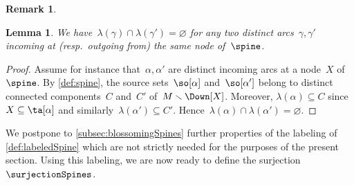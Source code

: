 \documentclass{amsart}
\newtheorem{lemma}[theorem]{Lemma}
\theoremstyle{definition}
\newtheorem{remark}[theorem]{Remark}
\newcommand{\ssm}{\smallsetminus} %
\newcommand{\labeling}{\lambda} %
\begin{document}
\begin{remark}
\end{remark}

\begin{lemma}
  \label{lem:labeledSpine}
  We have~$\labeling(\gamma) \cap \labeling(\gamma') = \varnothing$ for any two distinct arcs~$\gamma, \gamma'$ incoming at (resp.~outgoing from) the same node of~$\spine$.
\end{lemma}

\begin{proof}
  Assume for instance that~$\alpha, \alpha'$ are distinct incoming arcs at a node~$X$ of~$\spine$.
  By \cref{def:spine}, the source sets~$\so[\alpha]$ and~$\so[\alpha']$ belong to distinct connected components~$C$ and~$C'$ of~$M \ssm \Down[X]$.
  Moreover, $\labeling(\alpha) \subseteq C$ since~$X \subseteq \ta[\alpha]$ and similarly~$\labeling(\alpha') \subseteq C'$.
  Hence~$\labeling(\alpha) \cap \labeling(\alpha') = \varnothing$.
\end{proof}

We postpone to \cref{subsec:blossomingSpines} further properties of the labeling of \cref{def:labeledSpine} which are not strictly needed for the purposes of the present section.
Using this labeling, we are now ready to define the surjection~$\surjectionSpines$.
\end{document}
